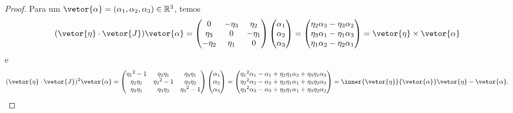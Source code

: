 \begin{proof}
    Para um \(\vetor{\alpha} = (\alpha_1, \alpha_2, \alpha_3) \in \mathbb{R}^3\), temos
    \begin{equation*}
        (\vetor{\eta}\cdot \vetor{J})\vetor{\alpha} =
        \begin{pmatrix}
            0 & -\eta_3 & \eta_2\\
            \eta_3 & 0 & -\eta_1\\
            -\eta_2 & \eta_1 & 0
        \end{pmatrix}
        \begin{pmatrix}
            \alpha_1\\
            \alpha_2\\
            \alpha_3
        \end{pmatrix} =
        \begin{pmatrix}
            \eta_2 \alpha_3-\eta_3\alpha_2\\
            \eta_3 \alpha_1-\eta_1\alpha_3\\
            \eta_1 \alpha_2-\eta_2\alpha_1
        \end{pmatrix} = \vetor{\eta} \times \vetor{\alpha}
    \end{equation*}
    e
    \begin{equation*}
        (\vetor{\eta}\cdot \vetor{J})^2\vetor{\alpha} =
        \begin{pmatrix}
            {\eta_1}^2-1 & \eta_2 \eta_1 & \eta_3 \eta_1\\
            \eta_2 \eta_1 & {\eta_2}^2 - 1 & \eta_3 \eta_2\\
            \eta_3 \eta_1 & \eta_3 \eta_2 & {\eta_3}^2 - 1
        \end{pmatrix}
        \begin{pmatrix}
            \alpha_1\\
            \alpha_2\\
            \alpha_3
        \end{pmatrix} =
        \begin{pmatrix}
            {\eta_1}^2 \alpha_1 - \alpha_1 + \eta_2 \eta_1 \alpha_2 + \eta_3 \eta_1 \alpha_3\\
            {\eta_2}^2 \alpha_2 - \alpha_2 + \eta_2 \eta_1 \alpha_1 + \eta_3 \eta_2 \alpha_3\\
            {\eta_3}^2 \alpha_3 - \alpha_3 + \eta_3 \eta_1 \alpha_1 + \eta_3 \eta_2 \alpha_2
        \end{pmatrix} =
        \inner{\vetor{\eta}}{\vetor{\alpha}}\vetor{\eta} - \vetor{\alpha}.
    \end{equation*}

\end{proof}
